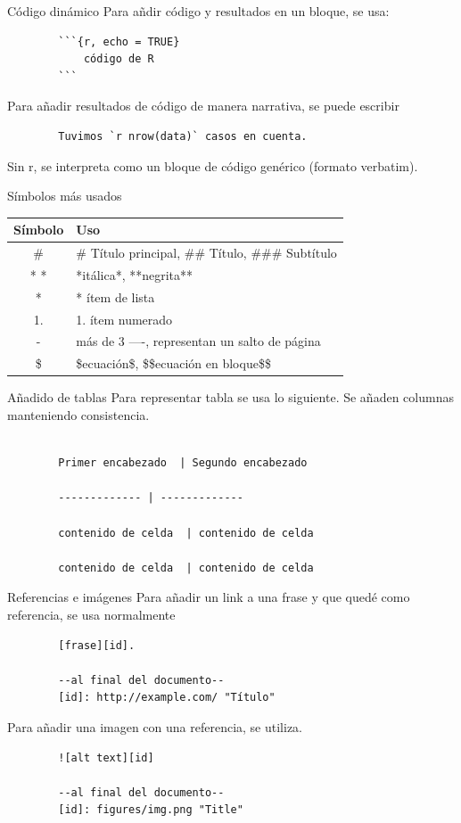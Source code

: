 \documentclass[aspectratio=169,xcolor=dvipsnames]{beamer}
\begin{document}
\begin{frame}[fragile]{Código dinámico}
    Para añdir código y resultados en un bloque, se usa:
    \begin{verbatim}
        ```{r, echo = TRUE}
            código de R
        ```
    \end{verbatim}
    Para añadir resultados de código de manera narrativa, se puede escribir
    \begin{verbatim}
        Tuvimos `r nrow(data)` casos en cuenta.
    \end{verbatim}
    Sin r, se interpreta como un bloque de código genérico (formato verbatim).
\end{frame}

\begin{frame}{Símbolos más usados}
    \begin{tabular}{|c|p{8cm}|}
            \hline
            \textbf{Símbolo} & \textbf{Uso} \\ \hline
            \# & \# Título principal, \#\# Título, \#\#\# Subtítulo \\ \hline
            * * & *itálica*, **negrita** \\ \hline
            * & * ítem de lista \\ \hline
            1. & 1. ítem numerado \\ \hline
            - & más de 3 ----, representan un salto de página\\ \hline
            \$ & \$ecuación\$, \$\$ecuación en bloque\$\$ \\ \hline       
    \end{tabular}
\end{frame}

\begin{frame}{Añadido de tablas}
    Para representar tabla se usa lo siguiente. Se añaden columnas manteniendo consistencia.
    \begin{verbatim}
        
        Primer encabezado  | Segundo encabezado

        ------------- | -------------

        contenido de celda  | contenido de celda

        contenido de celda  | contenido de celda
    \end{verbatim}
\end{frame}

\begin{frame}[fragile]{Referencias e imágenes}
    Para añadir un link a una frase y que quedé como referencia, se usa normalmente
    \begin{verbatim}
        [frase][id]. 

        --al final del documento--
        [id]: http://example.com/ "Título"
    \end{verbatim}
    Para añadir una imagen con una referencia, se utiliza.
    \begin{verbatim}
        ![alt text][id]

        --al final del documento--
        [id]: figures/img.png "Title"
    \end{verbatim}
\end{frame}
\end{document}
